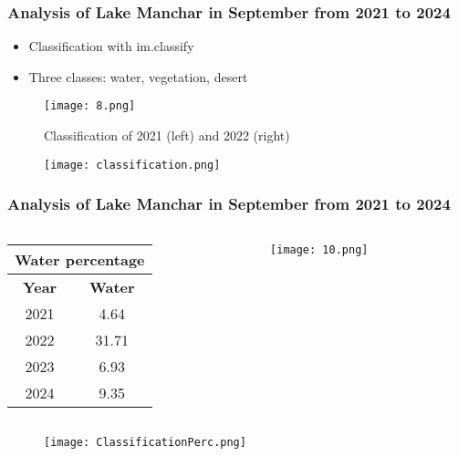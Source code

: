\documentclass{beamer}
\begin{document}
\begin{frame}
  \frametitle{\small Analysis of Lake Manchar in September from 2021 to 2024} 

    \begin{itemize}
        \item \small Classification with im.classify
        \item \small Three classes: water, vegetation, desert
    \end{itemize}
    
    \begin{figure}
        \centering
        \texttt{[image: 8.png]}
        \label{fig:enter-label}
        \caption{Classification of 2021 (left) and 2022 (right)}
    \end{figure}

    \begin{figure}
        \centering
        \texttt{[image: classification.png]}
        \label{fig:enter-label}
    \end{figure}
  
\end{frame}

\begin{frame}
  \frametitle{\small Analysis of Lake Manchar in September from 2021 to 2024} 

  \begin{columns} 
    \begin{column}{0.45\textwidth}  
      \centering
      \begin{tabular}{|c|c|}
      \hline
      \multicolumn{2}{|c|}{Water percentage} \\ 
      \hline
      \textbf{Year} & \textbf{Water} \\  
      \hline
      2021 & 4.64 \\
      \hline
      2022 & 31.71 \\
      \hline
      2023 & 6.93 \\
      \hline
      2024 & 9.35 \\
      \hline
      \end{tabular}
    \end{column}

    \begin{column}{0.45\textwidth}  
      \centering
      \texttt{[image: 10.png]}
      \label{fig:enter-label}
    \end{column}
  \end{columns}  

\begin{figure}
    \centering
    \texttt{[image: ClassificationPerc.png]}
    \label{fig:enter-label}
\end{figure}

\end{frame}
\end{document}
